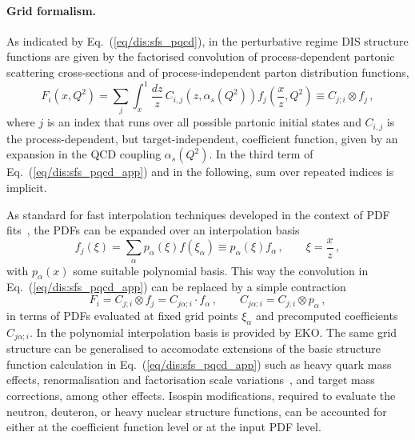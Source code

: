 \paragraph{Grid formalism.}
%
As indicated by Eq.~(\ref{eq/dis:sfs_pqcd}), in the perturbative regime DIS
structure functions are given by the factorised convolution of
process-dependent partonic scattering cross-sections and of process-independent
parton distribution functions,
\begin{equation}
\label{eq/dis:sfs_pqcd_app}
F_i(x,Q^2) = \sum_{j}\int_x^1 \frac{dz}{z}\, C_{i,j}(z,\alpha_s(Q^2))f_j\left( \frac{x}{z},Q^2\right) \equiv
C_{j; i} \otimes f_j\, ,
 \end{equation}
 where $j$ is an index that runs over all possible partonic initial states and
 $C_{i,j}$ is the process-dependent, but target-independent, coefficient
 function, given by an expansion in the QCD coupling $\alpha_s(Q^2)$.
 In the third term of Eq.~(\ref{eq/dis:sfs_pqcd_app}) and in the following, sum
 over repeated indices is implicit.
 
As standard for fast interpolation techniques developed in the context of PDF
fits~\cite{Carli:2010rw,Carrazza:2020gss,Wobisch:2011ij,Bertone:2014zva}, the
PDFs can be expanded over an interpolation basis \begin{equation}
f_j(\xi) = \sum_\alpha p_\alpha(\xi) f(\xi_\alpha) \equiv p_\alpha(\xi) f_\alpha \, ,
\qquad \xi = \frac x z \, ,
\end{equation}
with $p_\alpha(x)$ some suitable polynomial basis.
%
This way the convolution in Eq.~(\ref{eq/dis:sfs_pqcd_app}) can be replaced by
a simple contraction
\begin{equation}
\label{app/dis:grid_formalism}
F_i = C_{j; i} \otimes f_j = C_{j \alpha; i} \cdot f_\alpha \, ,\qquad
C_{j \alpha; i} = C_{j; i} \otimes p_\alpha \, ,
\end{equation}
in terms of PDFs evaluated at fixed grid points $\xi_\alpha$ and precomputed
coefficients $C_{j \alpha; i}$.
%
In \yadism the polynomial interpolation basis is  provided by \textsc{\small
EKO}.
%
The same grid structure can be generalised to accomodate extensions of the
basic structure function calculation in Eq.~(\ref{eq/dis:sfs_pqcd_app}) such as
heavy quark mass effects, renormalisation and factorisation scale
variations~\cite{NNPDF:2019vjt,NNPDF:2019ubu}, and target mass corrections,
among other effects.
%
Isospin modifications, required to evaluate the neutron, deuteron, or heavy
nuclear structure functions, can be accounted for either at the coefficient
function level or at the input PDF level.

